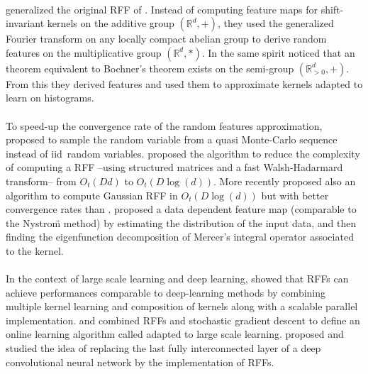 \documentclass[twoside,11pt]{article}
\begin{document}
\paragraph{}
 generalized the original \acs{RFF} of \citet{Rahimi2007}.
Instead of computing feature maps for shift-in\-va\-riant kernels on the
additive group $(\mathbb{R}^d, +)$, they used the generalized Fourier transform
on any locally compact abelian group to derive random features on the
multiplicative group $(\mathbb{R}^d, *)$. In the same spirit
\citet{yang2014random} noticed that an theorem equivalent to Bochner's theorem
exists on the semi-group $(\mathbb{R}_{>0}^d, +)$. From this they derived
 features and used them to approximate kernels adapted to
learn on histograms.
\paragraph{}
To speed-up the convergence rate of the random features approximation,
\citet{yang2014quasi} proposed to sample the random variable from a quasi
Monte-Carlo sequence instead of \acs{iid}~random variables. 
proposed the  algorithm to reduce the complexity of computing a
\acs{RFF} --using structured matrices and a fast Walsh-Hadarmard transform--
from $O_t(Dd)$ to $O_t(D\log(d))$. More recently \citet{felix2016orthogonal}
proposed also an algorithm  to compute Gaussian \acs{RFF} in
$O_t(D\log(d))$ but with better convergence rates than 
\citep{Le2013}.   proposed a data dependent feature
map (comparable to the Nystro\"m method) by estimating the distribution of the
input data, and then finding the eigenfunction decomposition of Mercer's
integral operator associated to the kernel.
\paragraph{}
In the context of large scale learning and deep learning, \citet{lu2014scale}
showed that \acsp{RFF} can achieve performances comparable to deep-learning
methods by combining multiple kernel learning and composition of kernels along
with a scalable parallel implementation.  and
\citet{xie2015scale} combined \acsp{RFF} and stochastic gradient descent to
define an online learning algorithm called  adapted to large scale learning.  proposed and
studied the idea of replacing the last fully interconnected layer of a deep
convolutional neural network \citep{lecun1995convolutional} by the
 implementation of \acsp{RFF}.
\end{document}
